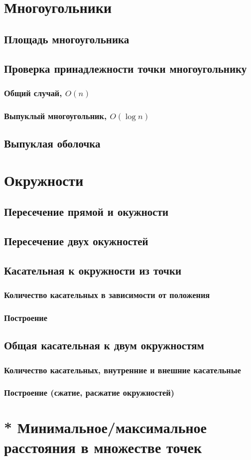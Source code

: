 \documentclass[a4paper,12pt]{article}
\begin{document}
\setcounter{tocdepth}{7}
\tableofcontents
\newpage

  \section{Многоугольники}
    \subsection{Площадь многоугольника}
    \subsection{Проверка принадлежности точки многоугольнику}
      \subsubsection{Общий случай, $O(n)$}
      \subsubsection{Выпуклый многоугольник, $O(\log n)$}
    \subsection{Выпуклая оболочка}
  \section{Окружности}
    \subsection{Пересечение прямой и окужности}
    \subsection{Пересечение двух окужностей}
    \subsection{Касательная к окружности из точки}
      \subsubsection{Количество касательных в зависимости от положения}
      \subsubsection{Построение}
    \subsection{Общая касательная к двум окружностям}
      \subsubsection{Количество касательных, внутренние и внешние касательные}
      \subsubsection{Построение (сжатие, расжатие окружностей)}
  \section{* Минимальное/максимальное расстояния в множестве точек}
\end{document}
